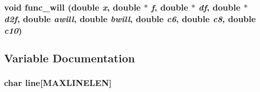 \subsubsection{\setlength{\rightskip}{0pt plus 5cm}void func\_\-will (double {\em x}, double $\ast$ {\em f}, double $\ast$ {\em df}, double $\ast$ {\em d2f}, double {\em awill}, double {\em bwill}, double {\em c6}, double {\em c8}, double {\em c10})}\label{test_2dzug_2md__funcvdw_8c_ae40f1230fd286d227a7c624c6f0c81f}




\subsection{Variable Documentation}
\subsubsection{\setlength{\rightskip}{0pt plus 5cm}char {\bf line}[MAXLINELEN]}\label{test_2dzug_2md__funcvdw_8c_e229e1410053afa7afc569ee71be8eca}


